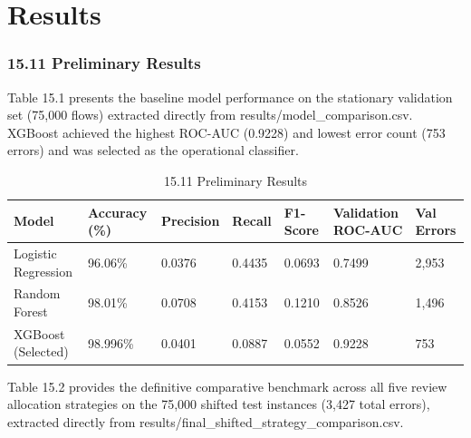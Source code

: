 \chapter{Results}

\subsection{15.11 Preliminary Results}

Table 15.1 presents the baseline model performance on the stationary validation set (75,000 flows) extracted directly from results/model\_comparison.csv. XGBoost achieved the highest ROC-AUC (0.9228) and lowest error count (753 errors) and was selected as the operational classifier.

\begin{table}[H]
\centering
\small
\begin{tabular}{p{} p{} p{} p{} p{} p{} p{}}
\toprule
\textbf{Model} & \textbf{Accuracy (\%)} & \textbf{Precision} & \textbf{Recall} & \textbf{F1-Score} & \textbf{Validation ROC-AUC} & \textbf{Val Errors} \\
\midrule
Logistic Regression & 96.06\% & 0.0376 & 0.4435 & 0.0693 & 0.7499 & 2,953 \\
Random Forest & 98.01\% & 0.0708 & 0.4153 & 0.1210 & 0.8526 & 1,496 \\
XGBoost (Selected) & 98.996\% & 0.0401 & 0.0887 & 0.0552 & 0.9228 & 753 \\
\bottomrule
\end{tabular}
\caption{15.11 Preliminary Results}
\end{table}

Table 15.2 provides the definitive comparative benchmark across all five review allocation strategies on the 75,000 shifted test instances (3,427 total errors), extracted directly from results/final\_shifted\_strategy\_comparison.csv.

